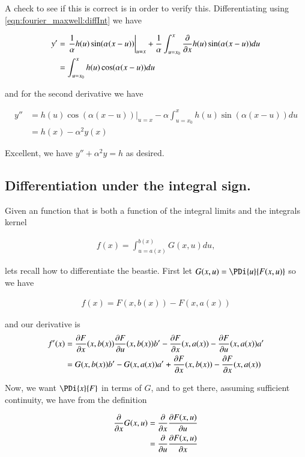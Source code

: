A check to see if this is correct is in order to verify this.  Differentiating using \ref{eqn:fourier_maxwell:diffInt} we have

\begin{align*}
y'
&=
{\left.
\frac{1}{\alpha}
h(u) \sin( \alpha(x-u) ) \right\vert}_{u=x}
+\frac{1}{\alpha} \int_{u=x_0}^x \PD{x}{} h(u) \sin( \alpha(x-u) ) du \\
&= \int_{u=x_0}^x h(u) \cos( \alpha(x-u) ) du \\
\end{align*}

and for the second derivative we have

\begin{align*}
y''
&=
{\left. h(u) \cos( \alpha(x-u) ) \right\vert}_{u=x}
- \alpha \int_{u=x_0}^x h(u) \sin( \alpha(x-u) ) du \\
&= h(x) - \alpha^2 y(x)
\end{align*}

Excellent, we have $y'' + \alpha^2 y = h$ as desired.

\subsection{Differentiation under the integral sign. }

Given an function that is both a function of the integral limits and the integrals kernel

\begin{align*}
f(x) = \int_{u = a(x)}^{b(x)} G(x,u) du,
\end{align*}

lets recall how to differentiate the beastie.  First let $G(x,u) = \PDi{u}{F(x,u)}$ so we have

\begin{align*}
f(x) = F(x,b(x)) - F(x,a(x))
\end{align*}

and our derivative is
\begin{align*}
f'(x)
&=
\PD{x}{F}(x,b(x))
\PD{u}{F}(x,b(x)) b'
-\PD{x}{F}(x,a(x))
-\PD{u}{F}(x,a(x)) a' \\
&=
G(x,b(x)) b'
-G(x,a(x)) a'
+\PD{x}{F}(x,b(x))
-\PD{x}{F}(x,a(x))
\\
\end{align*}

Now, we want $\PDi{x}{F}$ in terms of $G$, and to get there, assuming sufficient continuity, we have from the definition

\begin{align*}
\PD{x}{} G(x,u) 
&= \PD{x}{} \PD{u}{F(x,u)} \\
&= \PD{u}{} \PD{x}{F(x,u)} \\
\end{align*}


